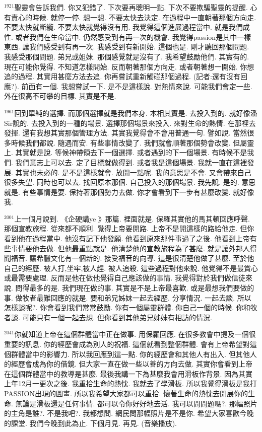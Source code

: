 \documentclass{book}
\begin{document}
$^{1921}$聖靈會告訴我們.
你又犯錯了.
下次要再聰明一點.
下次不要欺騙聖靈的提醒.
心有責心的時候.
就停一停.
想一想.
不要太快去決定.
在過程中一直朝著那個方向走.
不要太快就斷纜.
不要太快就覺得沒有用.
我覺得這個進展過程當中.
就是我們成性.
或者我們在生命當中.
仍然感受到有再一次的機會.
我覺得passion是其中一樣東西.
讓我們感受到有再一次.
我感受到有新開始.
這個也是.
剛才聽回那個問題.
我感受那個問題.
弟兄或姐妹.
那個感覺就是沒有了.
我希望鼓勵他們.
其實有的.
現在可能你覺得.
不知道怎樣開始.
反而朝著那個方向走.
或者朝著想一開始.
你想追的過程.
其實用甚麼方法去追.
你再嘗試重新觸碰那個過程.
(記者:還有沒有回應?).
前面有一個.
我想嘗試一下.
是不是這樣說.
對熱情來說.
可能我們會定一些.
外在很高不可攀的目標.
其實是不是.

$^{1961}$回到單純的選擇.
而那個選擇就是我們本身.
本相其實是.
去投入到的.
就好像潘Sir說的.
去投入到的一種的場景.
選擇那個場景來投入.
來對生命的熱情.
在那裡去發揮.
還有我想其實那個管理方法.
其實我覺得會不會用普通一句.
譬如說.
當然很多時候我們都說.
隨遇而安.
有些事情改變了.
我們就會順著那個勢會改變.
但屬靈上.
其實就是說.
等候神帶領去下一個選擇.
或者遇到的下一個場景.
有時候不是我們.
我們意志上可以去.
定了目標就做得到.
或者我是這個場景.
我就一直在這裡發展.
其實也未必的.
是不是這樣就會.
放開一點呢.
我的意思是不會.
又會帶來自己很多失望.
同時也可以去.
找回原本那個.
自己投入的那個場景.
我先說.
是的.
意思就是.
有些事情是要.
保持著那個勢力去做.
你才會看到下一步有甚麼改變.
就好像我.

$^{2001}$上一個月說到.
《企硬講ye 》那篇.
裡面就是.
保羅其實他的馬其頓回應呼聲.
那個宣教旅程.
從來都不順利.
覺得上帝要開路.
上帝不是開這樣的路給他走.
但你看到他在過程當中.
他沒有記下他發願.
他看到原來那件事過了之後.
他看到上帝有些事情要他去做.
但他最重點就是.
他清楚他的宣教旅程為了甚麼.
就是讓外邦人得聞福音.
讓希臘文化有一個新的.
接受福音的向導.
這是很清楚他做了甚麼.
至於他自己的經歷.
被人打,坐牢,被人趕.
被人追殺.
這些過程對他來說.
他覺得不是最賞心或最需要處理.
反而是他在做他覺得自己應該做的事情.
我覺得對於我們做信徒來說.
問得最多的是.
我們現在做的事.
其實是不是上帝最喜歡.
或是最想我們要做的事.
做牧者最難回應的就是.
要和弟兄姊妹一起去經歷.
分享情況.
一起去談.
所以怎樣談呢?.
你會看到我們常常鼓勵.
你有一個屬靈群體.
你自己一個的時候.
你和牧者談.
可能只有一個一起去想.
但你看到其他弟兄姊妹有相訪的情況.

$^{2041}$你就知道上帝在這個群體當中正在做事.
用保羅回應.
在很多教會中提及一個很重要的訊息.
你的經歷會成為別人的祝福.
這個就看到整個群體.
會有上帝希望對這個群體當中的影響力.
所以我回應到這一點.
你的經歷會和其他人有出入.
但其他人的經歷會成為你的借鏡.
但大家一直在做一些以善的方向去做.
其實你會看到上帝在這個群體當中的教導是甚麼.
最後我講一下為甚麼我會用滑板作背景.
因為其實上年12月一更次之後.
我重拾生命的熱忱.
我就去了學滑板.
所以我覺得滑板是我打PASSION出現的圖畫.
所以我希望大家都可以重拾.
懷著生命的熱忱去開展你的生命.
無論是滑板還是任何事情.
都可以令你好好地去活.
我可以問問題嗎?.
那幅照片的主角是誰?.
不是我吧?.
我都想問.
網民問那幅照片是不是你.
希望大家喜歡今晚的課堂.
我們今晚到此為止.
下個月見.
再見.
(音樂播放).
\newpage
\end{document}
